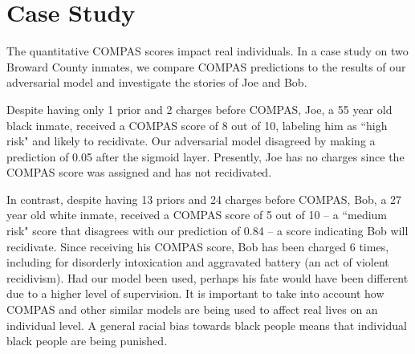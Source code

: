 \documentclass{article}
\begin{document}
\vspace{-2mm}
\section{Case Study}
\vspace{-2mm}
The quantitative COMPAS scores impact real individuals. In a case study on two Broward County inmates, we compare COMPAS predictions to the results of our adversarial model and investigate the stories of Joe and Bob.

Despite having only 1 prior and 2 charges before COMPAS, Joe, a 55 year old black inmate, received a COMPAS score of 8 out of 10, labeling him as ``high risk" and likely to recidivate. Our adversarial model disagreed by making a prediction of 0.05 after the sigmoid layer. Presently, Joe has no charges since the COMPAS score was assigned and has not recidivated. 

In contrast, despite having 13 priors and 24 charges before COMPAS, Bob, a 27 year old white inmate, received a COMPAS score of 5 out of 10 -- a ``medium risk" score that disagrees with our prediction of 0.84 -- a score indicating Bob will recidivate. Since receiving his COMPAS score, Bob has been charged 6 times, including for disorderly intoxication and aggravated battery (an act of violent recidivism). Had our model been used, perhaps his fate would have been different due to a higher level of supervision. It is important to take into account how COMPAS and other similar models are being used to affect real lives on an individual level. A general racial bias towards black people means that individual black people are being punished.

\end{document}
